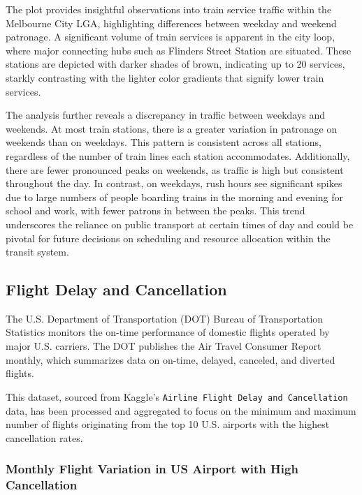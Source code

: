 The plot provides insightful observations into train service traffic within the Melbourne City LGA, highlighting differences between weekday and weekend patronage. A significant volume of train services is apparent in the city loop, where major connecting hubs such as Flinders Street Station are situated. These stations are depicted with darker shades of brown, indicating up to 20 services, starkly contrasting with the lighter color gradients that signify lower train services.

The analysis further reveals a discrepancy in traffic between weekdays and weekends. At most train stations, there is a greater variation in patronage on weekends than on weekdays. This pattern is consistent across all stations, regardless of the number of train lines each station accommodates. Additionally, there are fewer pronounced peaks on weekends, as traffic is high but consistent throughout the day. In contrast, on weekdays, rush hours see significant spikes due to large numbers of people boarding trains in the morning and evening for school and work, with fewer patrons in between the peaks. This trend underscores the reliance on public transport at certain times of day and could be pivotal for future decisions on scheduling and resource allocation within the transit system.

\hypertarget{flight-delay-and-cancellation}{%
\subsection{Flight Delay and Cancellation}\label{flight-delay-and-cancellation}}

The U.S. Department of Transportation (DOT) Bureau of Transportation Statistics monitors the on-time performance of domestic flights operated by major U.S. carriers. The DOT publishes the Air Travel Consumer Report monthly, which summarizes data on on-time, delayed, canceled, and diverted flights.

This dataset, sourced from Kaggle's \texttt{Airline\ Flight\ Delay\ and\ Cancellation} data, has been processed and aggregated to focus on the minimum and maximum number of flights originating from the top 10 U.S. airports with the highest cancellation rates.

\hypertarget{monthly-flight-variation-in-us-airport-with-high-cancellation}{%
\subsubsection{Monthly Flight Variation in US Airport with High Cancellation}\label{monthly-flight-variation-in-us-airport-with-high-cancellation}}

